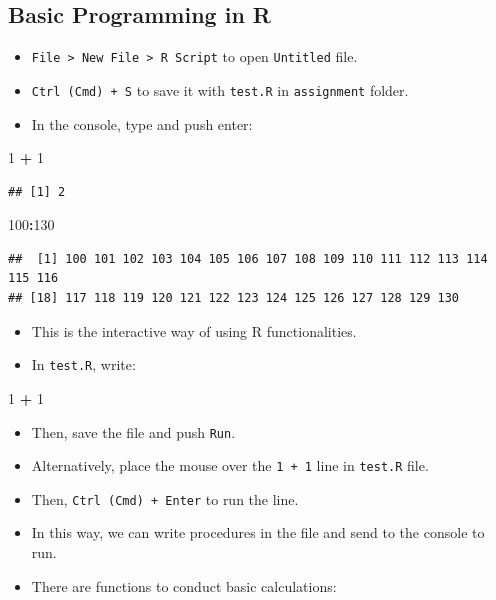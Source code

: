 \documentclass[]{book}
\newenvironment{Shaded}{\begin{snugshade}}{\end{snugshade}}
\newcommand{\DecValTok}[1]{\textcolor[rgb]{0.00,0.00,0.81}{#1}}
\newcommand{\StringTok}[1]{\textcolor[rgb]{0.31,0.60,0.02}{#1}}
\newcommand{\OperatorTok}[1]{\textcolor[rgb]{0.81,0.36,0.00}{\textbf{#1}}}
\providecommand{\tightlist}{%
  \setlength{\itemsep}{0pt}\setlength{\parskip}{0pt}}
\theoremstyle{definition}
\theoremstyle{definition}
\theoremstyle{definition}
\theoremstyle{remark}
\begin{document}
\subsection{Basic Programming in R}\label{basic-programming-in-r}

\begin{itemize}
\tightlist
\item
  \texttt{File\ \textgreater{}\ New\ File\ \textgreater{}\ R\ Script} to
  open \texttt{Untitled} file.
\item
  \texttt{Ctrl\ (Cmd)\ +\ S} to save it with \texttt{test.R} in
  \texttt{assignment} folder.
\item
  In the console, type and push enter:
\end{itemize}

\begin{Shaded}
\begin{Highlighting}[]
\DecValTok{1} \OperatorTok{+}\StringTok{ }\DecValTok{1}
\end{Highlighting}
\end{Shaded}

\begin{verbatim}
## [1] 2
\end{verbatim}

\begin{Shaded}
\begin{Highlighting}[]
\DecValTok{100}\OperatorTok{:}\DecValTok{130}
\end{Highlighting}
\end{Shaded}

\begin{verbatim}
##  [1] 100 101 102 103 104 105 106 107 108 109 110 111 112 113 114 115 116
## [18] 117 118 119 120 121 122 123 124 125 126 127 128 129 130
\end{verbatim}

\begin{itemize}
\tightlist
\item
  This is the interactive way of using R functionalities.
\item
  In \texttt{test.R}, write:
\end{itemize}

\begin{Shaded}
\begin{Highlighting}[]
\DecValTok{1} \OperatorTok{+}\StringTok{ }\DecValTok{1}
\end{Highlighting}
\end{Shaded}

\begin{itemize}
\item
  Then, save the file and push \texttt{Run}.
\item
  Alternatively, place the mouse over the \texttt{1\ +\ 1} line in
  \texttt{test.R} file.
\item
  Then, \texttt{Ctrl\ (Cmd)\ +\ Enter} to run the line.
\item
  In this way, we can write procedures in the file and send to the
  console to run.
\item
  There are functions to conduct basic calculations:
\end{itemize}
\end{document}
